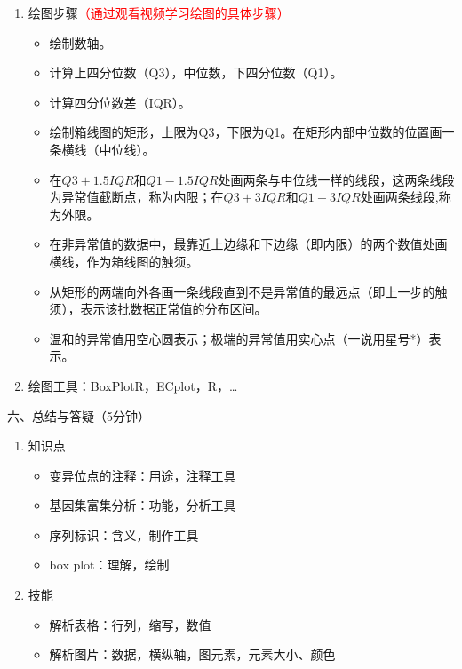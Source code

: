 \documentclass{TIJMUjiaoanLL}
\begin{document}
\begin{enumerate}
  \item 绘图步骤\textcolor{red}{（通过观看视频学习绘图的具体步骤）}
  \begin{itemize}
  \item 绘制数轴。
  \item 计算上四分位数（Q3），中位数，下四分位数（Q1）。
  \item 计算四分位数差（IQR）。
  \item 绘制箱线图的矩形，上限为Q3，下限为Q1。在矩形内部中位数的位置画一条横线（中位线）。
  \item 在$Q3 + 1.5IQR$和$Q1 - 1.5IQR$处画两条与中位线一样的线段，这两条线段为异常值截断点，称为内限；在$Q3 + 3IQR$和$Q1 - 3IQR$处画两条线段,称为外限。
  \item 在非异常值的数据中，最靠近上边缘和下边缘（即内限）的两个数值处画横线，作为箱线图的触须。
  \item 从矩形的两端向外各画一条线段直到不是异常值的最远点（即上一步的触须），表示该批数据正常值的分布区间。
  \item 温和的异常值用空心圆表示；极端的异常值用实心点（一说用星号*）表示。
  \end{itemize}
  \item 绘图工具：BoxPlotR，ECplot，R，\ldots
\end{enumerate}

\vspace*{0.2cm}
\noindent
六、总结与答疑（5分钟）
\begin{enumerate}
  \item 知识点
    \begin{itemize}
      \item 变异位点的注释：用途，注释工具
      \item 基因集富集分析：功能，分析工具
      \item 序列标识：含义，制作工具
      \item box plot：理解，绘制
    \end{itemize}
  \item 技能
    \begin{itemize}
      \item 解析表格：行列，缩写，数值
      \item 解析图片：数据，横纵轴，图元素，元素大小、颜色
    \end{itemize}
\end{enumerate}

\otherTail
\end{document}
